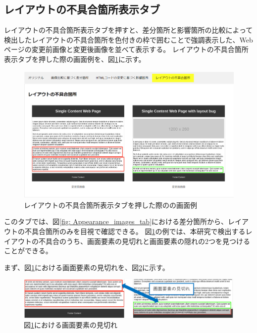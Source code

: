 \subsection{レイアウトの不具合箇所表示タブ}\label{subsec:subeffect_tab}
レイアウトの不具合箇所表示タブを押すと、差分箇所と影響箇所の比較によって検出したレイアウトの不具合箇所を色付きの枠で囲むことで強調表示した、Webページの変更前画像と変更後画像を並べて表示する。
レイアウトの不具合箇所表示タブを押した際の画面例を、図\ref{fig: Appearance_subEffect_tab}に示す。
\begin{figure}[tp]
    \begin{center}
        \includegraphics[width=1.0\columnwidth]{image/3_subEffect_tab2.png}
        \caption{レイアウトの不具合箇所表示タブを押した際の\toolName の画面例}
        \label{fig: Appearance_subEffect_tab}
    \end{center}
\end{figure}
このタブでは、図\ref{fig: Appearance_images_tab}における差分箇所から、レイアウトの不具合箇所のみを目視で確認できる。
図\ref{fig: Appearance_subEffect_tab}の例では、本研究で検出するレイアウトの不具合のうち、画面要素の見切れと画面要素の隠れの2つを見つけることができる。
\par
まず、図\ref{fig: Appearance_subEffect_tab}における画面要素の見切れを、図\ref{fig: out_of_element}に示す。
\begin{figure}[tp]
    \begin{center}
        \includegraphics[width=1.0\columnwidth]{image/3_out_of_element2.png}
        \caption{図\ref{fig: Appearance_subEffect_tab}における画面要素の見切れ}
        \label{fig: out_of_element}
    \end{center}
\end{figure}
